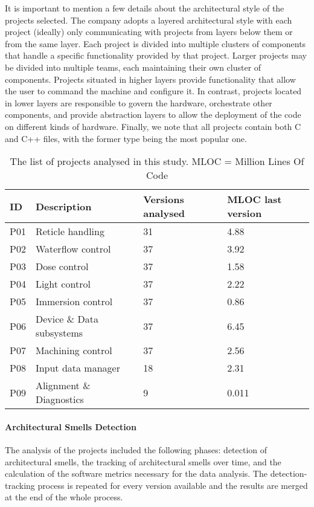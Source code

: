 It is important to mention a few details about the architectural style of the projects selected. 
The company adopts a layered architectural style with each project (ideally) only communicating with projects from layers below them or from the same layer.
Each project is divided into multiple clusters of components that handle a specific functionality provided by that project. Larger projects may be divided into multiple teams, each maintaining their own cluster of components.
Projects situated in higher layers provide functionality that allow the user to command the machine and configure it.
In contrast, projects located in lower layers are responsible to govern the hardware, orchestrate other components, and provide abstraction layers to allow the deployment of the code on different kinds of hardware.
Finally, we note that all projects contain both C and C++ files, with the former type being the most popular one. 

\begin{table}[tbp]
    \footnotesize
    \centering
    \caption{The list of projects analysed in this study. MLOC = Million Lines Of Code}
    \label{c4:tab:projects}
    \begin{tabular}{@{}llll@{}}
    \toprule
    \textbf{ID} & \textbf{Description} & \textbf{Versions analysed} & \textbf{MLOC last version} \\ \midrule
    P01  & Reticle handling     & 31        & 4.88         \\ %
    P02  & Waterflow control    & 37        & 3.92         \\ %
    P03  & Dose control         & 37        & 1.58         \\ %
    P04  & Light control        & 37        & 2.22         \\ %
    P05  & Immersion control    & 37        & 0.86         \\ %
    P06  & Device \& Data subsystems & 37    & 6.45         \\ %
    P07  & Machining control    & 37        & 2.56         \\ %
    P08  & Input data manager   & 18        & 2.31         \\ %
    P09  & Alignment \& Diagnostics & 9     & 0.011      \\ %
    \bottomrule
    \end{tabular}
\end{table}

\paragraph{Architectural Smells Detection}
The analysis of the projects included the following phases: detection of architectural smells, the tracking of architectural smells over time, and the calculation of the software metrics necessary for the data analysis. 
The detection-tracking process is repeated for every version available and the results are merged at the end of the whole process.

